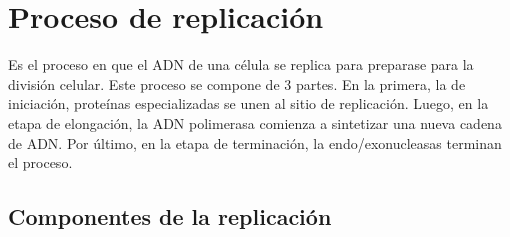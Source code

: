 



\section{Proceso de replicación} %

Es el proceso en que el ADN de una célula se replica para preparase para la división celular. Este proceso se compone de 3 partes. En la primera, la de iniciación, proteínas especializadas se unen al sitio de replicación. Luego, en la etapa de elongación, la ADN polimerasa comienza a sintetizar una nueva cadena de ADN. Por último, en la etapa de terminación, la endo/exonucleasas terminan el proceso.

\subsection{Componentes de la replicación}

